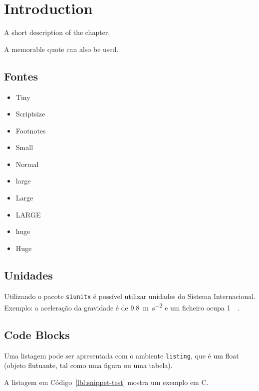 \chapter{Introduction}%
\label{chapter:introduction}

\begin{introduction}
A short description of the chapter.

A memorable quote can also be used.
\end{introduction}




\section{Fontes}

\begin{itemize}
\item{\tiny Tiny}
\item{\scriptsize Scriptsize}
\item{\footnotesize Footnotes}
\item{\small Small}
\item{\normalsize Normal}
\item{\large large}
\item{\Large Large}
\item{\LARGE LARGE}
\item{\huge huge}
\item{\Huge Huge}
\end{itemize}

\section{Unidades}

Utilizando o pacote \verb|siunitx| é possível utilizar unidades do Sistema Internacional. Exemplo: a aceleração da gravidade é de \SI{9.8}{\metre\per\second\squared} e um ficheiro ocupa \SI{1}{\mebi\byte}. 

\section{Code Blocks}
Uma listagem pode ser apresentada com o ambiente \texttt{listing}, que é um float (objeto flutuante, tal como uma figura ou uma tabela).

A listagem em Código~\ref{lbl:snippet-test} mostra um exemplo em C.


